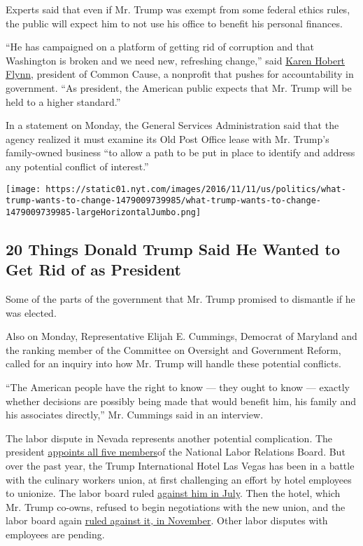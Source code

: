 Experts said that even if Mr. Trump was exempt from some federal ethics
rules, the public will expect him to not use his office to benefit his
personal finances.

``He has campaigned on a platform of getting rid of corruption and that
Washington is broken and we need new, refreshing change,'' said
\href{http://www.commoncause.org/about/staff-directory/karen-hobert-flynn.html?referrer=https://www.google.com/}{Karen
Hobert Flynn}, president of Common Cause, a nonprofit that pushes for
accountability in government. ``As president, the American public
expects that Mr. Trump will be held to a higher standard.''

In a statement on Monday, the General Services Administration said that
the agency realized it must examine its Old Post Office lease with Mr.
Trump's family-owned business ``to allow a path to be put in place to
identify and address any potential conflict of interest.''

\href{https://www.nytimes.com/interactive/2016/11/11/us/politics/what-trump-wants-to-change.html}{}

\texttt{[image: https://static01.nyt.com/images/2016/11/11/us/politics/what-trump-wants-to-change-1479009739985/what-trump-wants-to-change-1479009739985-largeHorizontalJumbo.png]}

\hypertarget{20-things-donald-trump-said-he-wanted-to-get-rid-of-as-president}{%
\subsection{20 Things Donald Trump Said He Wanted to Get Rid of as
President}\label{20-things-donald-trump-said-he-wanted-to-get-rid-of-as-president}}

Some of the parts of the government that Mr. Trump promised to dismantle
if he was elected.

Also on Monday, Representative Elijah E. Cummings, Democrat of Maryland
and the ranking member of the Committee on Oversight and Government
Reform, called for an inquiry into how Mr. Trump will handle these
potential conflicts.

``The American people have the right to know --- they ought to know ---
exactly whether decisions are possibly being made that would benefit
him, his family and his associates directly,'' Mr. Cummings said in an
interview.

The labor dispute in Nevada represents another potential complication.
The president \href{https://www.nlrb.gov/who-we-are/board}{appoints all
five members}of the National Labor Relations Board. But over the past
year, the Trump International Hotel Las Vegas has been in a battle with
the culinary workers union, at first challenging an effort by hotel
employees to unionize. The labor board ruled
\href{http://www.culinaryunion226.org/news/press/body/2016-07-28-NLRB-Board-Decision-ORDER-DENYING-REVIEW.pdf}{against
him in July}. Then the hotel, which Mr. Trump co-owns, refused to begin
negotiations with the new union, and the labor board again
\href{http://www.culinaryunion226.org/news/press/body/2016-11-03-NLRB-decision-and-order-re-TRUMP.pdf}{ruled
against it, in November}. Other labor disputes with employees are
pending.

